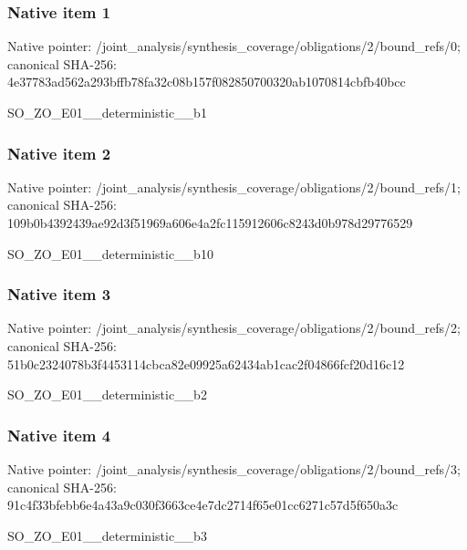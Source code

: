 \documentclass[10pt,a4paper]{article}
\begin{document}
\subsubsection{Native item 1}
Native pointer: /joint\_\allowbreak{}analysis/synthesis\_\allowbreak{}coverage/obligations/2/bound\_\allowbreak{}refs/0; canonical SHA-256: 4e37783ad562a293bffb78fa32c08b157f082850700320ab1070814cbfb40bcc

\begingroup\raggedright\sloppy SO\_\allowbreak{}ZO\_\allowbreak{}E01\_\allowbreak{}\_\allowbreak{}deterministic\_\allowbreak{}\_\allowbreak{}b1\par\endgroup

\subsubsection{Native item 2}
Native pointer: /joint\_\allowbreak{}analysis/synthesis\_\allowbreak{}coverage/obligations/2/bound\_\allowbreak{}refs/1; canonical SHA-256: 109b0b4392439ae92d3f51969a606e4a2fc115912606c8243d0b978d29776529

\begingroup\raggedright\sloppy SO\_\allowbreak{}ZO\_\allowbreak{}E01\_\allowbreak{}\_\allowbreak{}deterministic\_\allowbreak{}\_\allowbreak{}b10\par\endgroup

\subsubsection{Native item 3}
Native pointer: /joint\_\allowbreak{}analysis/synthesis\_\allowbreak{}coverage/obligations/2/bound\_\allowbreak{}refs/2; canonical SHA-256: 51b0c2324078b3f4453114cbca82e09925a62434ab1cac2f04866fcf20d16c12

\begingroup\raggedright\sloppy SO\_\allowbreak{}ZO\_\allowbreak{}E01\_\allowbreak{}\_\allowbreak{}deterministic\_\allowbreak{}\_\allowbreak{}b2\par\endgroup

\subsubsection{Native item 4}
Native pointer: /joint\_\allowbreak{}analysis/synthesis\_\allowbreak{}coverage/obligations/2/bound\_\allowbreak{}refs/3; canonical SHA-256: 91c4f33bfebb6e4a43a9c030f3663ce4e7dc2714f65e01cc6271c57d5f650a3c

\begingroup\raggedright\sloppy SO\_\allowbreak{}ZO\_\allowbreak{}E01\_\allowbreak{}\_\allowbreak{}deterministic\_\allowbreak{}\_\allowbreak{}b3\par\endgroup
\end{document}
